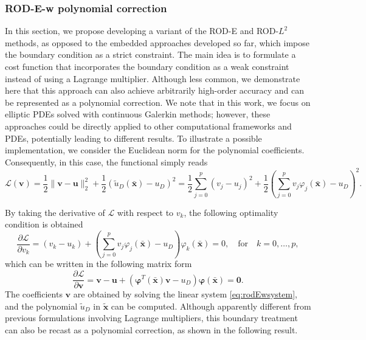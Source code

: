\documentclass{article}
\renewcommand{\phi}{\varphi}
\begin{document}
\subsubsection{ROD-E-w polynomial correction}

In this section, we propose developing a variant of the ROD-E and ROD-$L^2$ methods, as opposed to the embedded approaches developed so far, which impose the boundary condition as a strict constraint. The main idea is to formulate a cost function that incorporates the boundary condition as a weak constraint instead of using a Lagrange multiplier. Although less common, we demonstrate here that this approach can also achieve arbitrarily high-order accuracy and can be represented as a polynomial correction. We note that in this work, we focus on elliptic PDEs solved with continuous Galerkin methods; however, these approaches could be directly applied to other computational frameworks and PDEs, potentially leading to different results. To illustrate a possible implementation, we consider the Euclidean norm for the polynomial coefficients. Consequently, in this case, the functional simply reads
\begin{equation}
     \mathcal{L}(\boldsymbol{v}) = \frac12 \|\boldsymbol{v} - \boldsymbol{u}\|^2_2 +  \frac12(\tilde u_D(\bar{\boldsymbol{x}}) - u_D)^2 = \frac12 \sum_{j=0}^p (v_j - u_j)^2 + \frac12\left( \sum_{j=0}^p v_j \phi_j(\bar{\boldsymbol{x}}) - u_D \right)^2.
\end{equation}

By taking the derivative of $\mathcal{L}$ with respect to $v_k$, the following optimality condition is obtained
\begin{equation}
    \frac{\partial \mathcal{L}}{\partial v_k} = (v_k - u_k) + \left( \sum_{j=0}^p v_j \phi_j(\bar{\boldsymbol{x}}) - u_D \right) \phi_k(\bar{\boldsymbol{x}}) = 0, \quad \text{for} \quad k = 0,\dots,p,
\end{equation}  
which can be written in the following matrix form
\begin{equation}\label{eq:rodEwsystem}
    \frac{\partial \mathcal{L}}{\partial \boldsymbol{v}} = \boldsymbol{v} - \boldsymbol{u} + (\boldsymbol{\phi}^T(\bar{\boldsymbol{x}}) \boldsymbol{v} - u_D) \boldsymbol{\phi}(\bar{\boldsymbol{x}}) = \boldsymbol{0}.
\end{equation}
The coefficients $\boldsymbol{v}$ are obtained by solving the linear system \eqref{eq:rodEwsystem}, and the polynomial $\tilde u_D$ in $\tilde{\boldsymbol{x}}$ can be computed. Although apparently different from previous formulations involving Lagrange multipliers, this boundary treatment can also be recast as a polynomial correction, as shown in the following result. 
\end{document}
